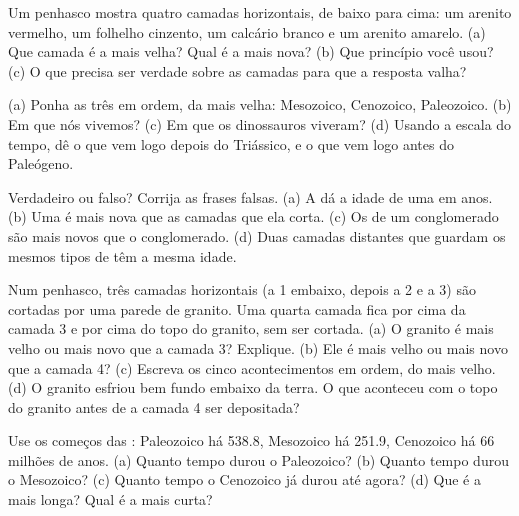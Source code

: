 \begin{exercise}[$\star$]\label{exo:g7:geological-time:2}
Um penhasco mostra quatro camadas horizontais, de baixo para cima: um
arenito vermelho, um folhelho cinzento, um calcário branco e um arenito
amarelo. (a) Que camada é a mais velha? Qual é a mais nova? (b) Que
princípio você usou? (c) O que precisa ser verdade sobre as camadas para
que a resposta valha?
\end{exercise}

\begin{exercise}[$\star$]\label{exo:g7:geological-time:3}
(a) Ponha as três  em ordem, da mais velha: Mesozoico, Cenozoico,
Paleozoico. (b) Em que  nós vivemos? (c) Em que  os dinossauros
viveram? (d) Usando a escala do tempo, dê o  que vem
logo depois do Triássico, e o que vem logo antes do Paleógeno.
\end{exercise}

\begin{exercise}[$\star$]\label{exo:g7:geological-time:4}
Verdadeiro ou falso? Corrija as frases falsas. (a) A  dá
a idade de uma  em anos. (b) Uma  é mais nova que as camadas
que ela corta. (c) Os  de um conglomerado são mais novos que o
conglomerado. (d) Duas camadas distantes que guardam os mesmos tipos de
 têm a mesma idade.
\end{exercise}

\begin{exercise}[$\star\star$]\label{exo:g7:geological-time:5}
Num penhasco, três camadas horizontais (a 1 embaixo, depois a 2 e a 3)
são cortadas por uma parede de granito. Uma quarta camada fica por cima
da camada 3 e por cima do topo do granito, sem ser cortada. (a) O granito
é mais velho ou mais novo que a camada 3? Explique. (b) Ele é mais velho
ou mais novo que a camada 4? (c) Escreva os cinco acontecimentos em
ordem, do mais velho. (d) O granito esfriou bem fundo embaixo da terra.
O que aconteceu com o topo do granito antes de a camada 4 ser
depositada?
\end{exercise}

\begin{exercise}[$\star\star$]\label{exo:g7:geological-time:6}
Use os começos das : Paleozoico há \num{538.8}, Mesozoico há
\num{251.9}, Cenozoico há \num{66} milhões de anos. (a) Quanto tempo durou
o Paleozoico? (b) Quanto tempo durou o Mesozoico? (c) Quanto tempo o
Cenozoico já durou até agora? (d) Que  é a mais longa? Qual é a mais
curta?
\end{exercise}

